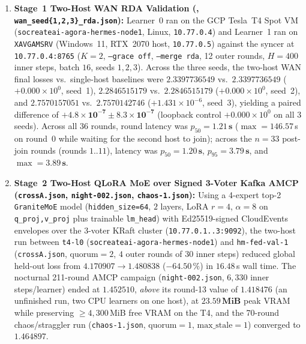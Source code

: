 \documentclass[11pt,a4paper]{article}
\begin{document}
\begin{enumerate}[leftmargin=1.8em]
    \item \textbf{Stage~1 Two-Host WAN RDA Validation (, \texttt{wan\_seed\{1,2,3\}\_rda.json}):} Learner~0 ran on the GCP Tesla~T4 Spot VM (\texttt{socreateai-agora-hermes-node1}, Linux, \texttt{10.77.0.4}) and Learner~1 ran on \texttt{XAVGAMSRV} (Windows~11, RTX~2070 host, \texttt{10.77.0.5}) against the syncer at \texttt{10.77.0.4:8765} ($K=2$, \texttt{--grace off}, \texttt{--merge rda}, 12 outer rounds, $H=400$ inner steps, batch $16$, seeds $1, 2, 3$). Across the three seeds, the two-host WAN final losses vs.\ single-host baselines were $\mathbf{2.3397736549}$ vs.\ $2.3397736549$ ($+0.000\times 10^0$, seed~1), $\mathbf{2.2846515179}$ vs.\ $2.2846515179$ ($+0.000\times 10^0$, seed~2), and $\mathbf{2.7570157051}$ vs.\ $2.7570142746$ ($+1.431\times 10^{-6}$, seed~3), yielding a paired difference of $\mathbf{+4.8\times 10^{-7} \pm 8.3\times 10^{-7}}$ (loopback control $+0.000\times 10^0$ on all 3 seeds). Across all $36$ rounds, round latency was $p_{50} = \mathbf{1.21\,\text{s}}$ ($\max = 146.57$\,s on round~0 while waiting for the second host to join); across the $n=33$ post-join rounds (rounds $1..11$), latency was $p_{50} = \mathbf{1.20\,\text{s}}$, $p_{95} = \mathbf{3.79\,\text{s}}$, and $\max = \mathbf{3.89\,\text{s}}$.
    \item \textbf{Stage~2 Two-Host QLoRA MoE over Signed 3-Voter Kafka AMCP (\texttt{crossA.json}, \texttt{night-002.json}, \texttt{chaos-1.json}):} Using a 4-expert top-2 \texttt{GraniteMoE} model (\texttt{hidden\_size=64}, $2$ layers, LoRA $r=4$, $\alpha=8$ on \texttt{q\_proj,v\_proj} plus trainable \texttt{lm\_head}) with Ed25519-signed CloudEvents envelopes over the 3-voter KRaft cluster (\texttt{10.77.0.1..3:9092}), the two-host run between \texttt{t4-l0} (\texttt{socreateai-agora-hermes-node1}) and \texttt{hm-fed-val-1} (\texttt{crossA.json}, $\text{quorum}=2$, $4$ outer rounds of $30$ inner steps) reduced global held-out loss from $\mathbf{4.170907 \to 1.480838}$ ($-64.50\,\%$) in $16.48$\,s wall time. The nocturnal 211-round AMCP campaign (\texttt{night-002.json}, $6{,}330$ inner steps/learner) ended at $\mathbf{1.452510}$, \emph{above} its round-13 value of $1.418476$ (an unfinished run, two CPU learners on one host), at $\mathbf{23.59\,\text{MiB}}$ peak VRAM while preserving $\ge 4{,}300$\,MiB free VRAM on the T4, and the 70-round chaos/straggler run (\texttt{chaos-1.json}, $\text{quorum}=1$, $\text{max\_stale}=1$) converged to $\mathbf{1.464897}$.

\end{enumerate}
\end{document}
